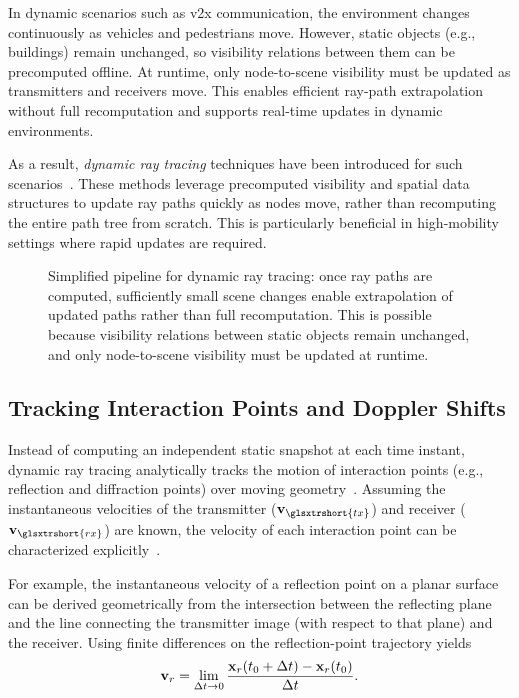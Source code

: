 In dynamic scenarios such as \gls{v2x} communication, the environment changes continuously as vehicles and pedestrians move. However, static objects (e.g., buildings) remain unchanged, so visibility relations between them can be precomputed offline. At runtime, only node-to-scene visibility must be updated as transmitters and receivers move. This enables efficient ray-path extrapolation without full recomputation and supports real-time updates in dynamic environments.

As a result, \emph{dynamic ray tracing} techniques have been introduced for such scenarios~. These methods leverage precomputed visibility and spatial data structures to update ray paths quickly as nodes move, rather than recomputing the entire path tree from scratch. This is particularly beneficial in high-mobility settings where rapid updates are required.

\begin{figure}
  \centering
  \caption{Simplified pipeline for dynamic ray tracing: once ray paths are computed, sufficiently small scene changes enable extrapolation of updated paths rather than full recomputation. This is possible because visibility relations between static objects remain unchanged, and only node-to-scene visibility must be updated at runtime.}
\end{figure}

\subsection{Tracking Interaction Points and Doppler Shifts}

Instead of computing an independent static snapshot at each time instant, dynamic ray tracing analytically tracks the motion of interaction points (e.g., reflection and diffraction points) over moving geometry~. Assuming the instantaneous velocities of the transmitter ($\bsup{v}_{\glsxtrshort{tx}}$) and receiver ($\bsup{v}_{\glsxtrshort{rx}}$) are known, the velocity of each interaction point can be characterized explicitly~.

For example, the instantaneous velocity of a reflection point on a planar surface can be derived geometrically from the intersection between the reflecting plane and the line connecting the transmitter image (with respect to that plane) and the receiver. Using finite differences on the reflection-point trajectory yields
\begin{equation}
  \mathbf{v}_r = \lim_{\Delta t \to 0} \frac{\mathbf{x}_r(t_0+\Delta t) - \mathbf{x}_r(t_0)}{\Delta t}.
\end{equation}

